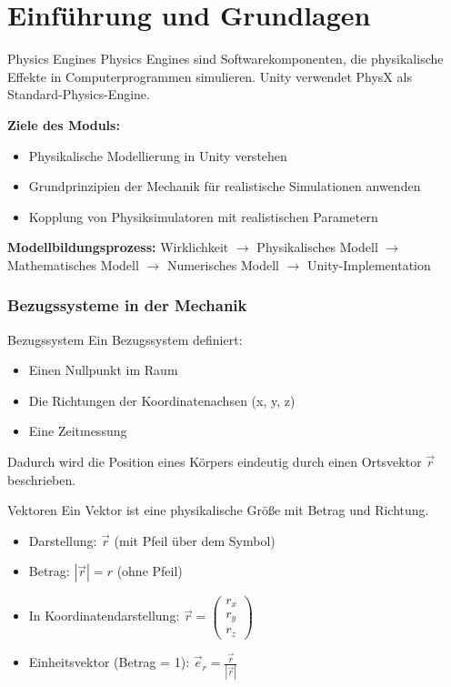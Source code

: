 \section{Einführung und Grundlagen}

\begin{concept}{Physics Engines}
    Physics Engines sind Softwarekomponenten, die physikalische Effekte in Computerprogrammen simulieren. Unity verwendet PhysX als Standard-Physics-Engine.
    
    \textbf{Ziele des Moduls:}
    \begin{itemize}
        \item Physikalische Modellierung in Unity verstehen
        \item Grundprinzipien der Mechanik für realistische Simulationen anwenden
        \item Kopplung von Physiksimulatoren mit realistischen Parametern
    \end{itemize}
\end{concept}

\begin{remark}
    \textbf{Modellbildungsprozess:}
    Wirklichkeit $\rightarrow$ Physikalisches Modell $\rightarrow$ Mathematisches Modell $\rightarrow$ Numerisches Modell $\rightarrow$ Unity-Implementation
\end{remark}

\subsubsection{Bezugssysteme in der Mechanik}

\begin{definition}{Bezugssystem}
    Ein Bezugssystem definiert:
    \begin{itemize}
        \item Einen Nullpunkt im Raum
        \item Die Richtungen der Koordinatenachsen (x, y, z)
        \item Eine Zeitmessung
    \end{itemize}
    Dadurch wird die Position eines Körpers eindeutig durch einen Ortsvektor $\vec{r}$ beschrieben.
\end{definition}

\begin{concept}{Vektoren}
    Ein Vektor ist eine physikalische Größe mit Betrag und Richtung.
    \begin{itemize}
        \item Darstellung: $\vec{r}$ (mit Pfeil über dem Symbol)
        \item Betrag: $|\vec{r}| = r$ (ohne Pfeil)
        \item In Koordinatendarstellung: $\vec{r} = \begin{pmatrix} r_x \\ r_y \\ r_z \end{pmatrix}$
        \item Einheitsvektor (Betrag = 1): $\vec{e}_r = \frac{\vec{r}}{|\vec{r}|}$
    \end{itemize}
\end{concept}

